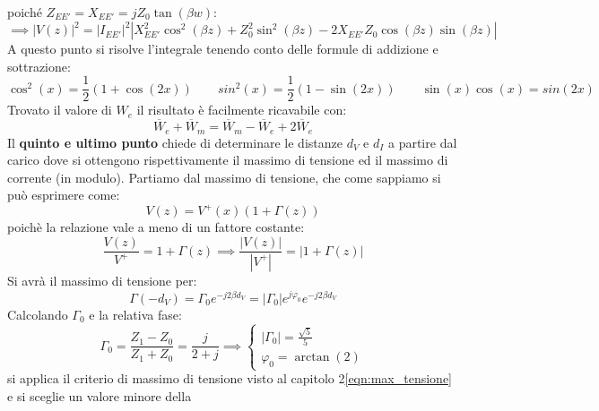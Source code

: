 \documentclass{book}
\begin{document}
        poiché $Z_{EE'}=X_{EE'}=jZ_{0}\tan(\beta w)$:
        \begin{equation}
            \implies |V(z)| ^{2} = |I_{EE'}| ^{2}|X_{EE'}^{2}\cos^{2}(\beta z)+Z_{0}^{2}\sin^{2}(\beta z)-2X_{EE'}Z_{0}\cos(\beta z)\sin(\beta z)|
        \end{equation}
        A questo punto si risolve l'integrale tenendo conto delle formule di addizione e sottrazione:
        \begin{equation}
            \cos^{2}(x)=\frac{1}{2}(1+\cos(2x)) \qquad sin^{2}(x)=\frac{1}{2}(1-\sin(2x)) \qquad \sin(x)\cos(x)=sin(2x)
        \end{equation}
        Trovato il valore di $W_{e}$ il risultato è facilmente ricavabile con:
        \begin{equation}
            \overline{W}_{e}+\overline{W}_{m}=\overline{W}_{m}-\overline{W}_{e}+2 \overline{W}_{e}
        \end{equation}
        Il \textbf{quinto e ultimo punto} chiede di determinare le distanze $d_{V}$ e $d_{I}$ a partire dal carico dove si ottengono 
        rispettivamente il massimo di tensione ed il massimo di corrente (in modulo). Partiamo dal massimo di tensione, che come sappiamo si può
        esprimere come:
        \begin{equation}
            V(z)=V^{+}(x)(1+\Gamma (z))
        \end{equation}
        poichè la relazione vale a meno di un fattore costante:
        \begin{equation}
            \frac{V(z)}{V^{+}}=1+\Gamma(z) \implies \frac{|V(z)|}{|V^{+}|} = |1+\Gamma (z)|
        \end{equation}
        Si avrà il massimo di tensione per:
        \begin{equation}
            \Gamma (-d_{V}) = \Gamma_{0}e^{-j2 \beta d_{V}} = |\Gamma_{0}|e^{j \varphi_{0}}e^{-j 2 \beta d_{V}}
        \end{equation}
        Calcolando $\Gamma_{0}$ e la relativa fase:
        \begin{equation}
            \Gamma_{0} = \frac{Z_{1}-Z_{0}}{Z_{1}+Z_{0}} = \frac{j}{2+j} \implies 
            \begin{cases}
                |\Gamma_{0}| = \frac{\sqrt{5}}{5} \\ \varphi_{0}=\arctan(2)    
            \end{cases}
        \end{equation}
        si applica il criterio di massimo di tensione visto al capitolo 2\ref{eqn:max_tensione} e si sceglie un valore minore della 
\end{document}
